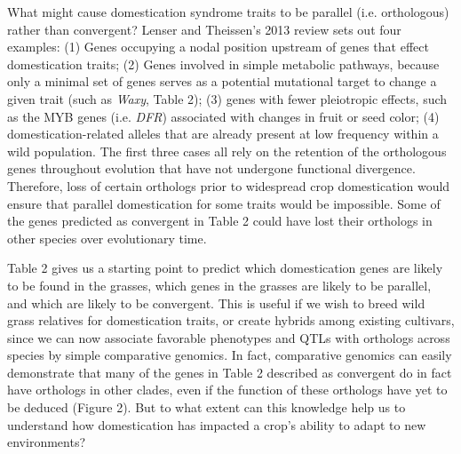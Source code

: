 \documentclass[12pt]{article}
\begin{document}
What might cause domestication syndrome traits to be parallel (i.e. orthologous) rather than convergent?
Lenser and Theissen's 2013 review \citep{Lenser2013} sets out four examples: (1) Genes occupying a nodal position upstream of genes that effect domestication traits; (2) Genes involved in simple metabolic pathways, because only a minimal set of genes serves as a potential mutational target to change a given trait (such as \textit{Waxy}, Table 2); (3) genes with fewer pleiotropic effects, such as the MYB genes (i.e. \textit{DFR}) associated with changes in fruit or seed color; (4) domestication-related alleles that are already present at low frequency within a wild population. 
The first three cases all rely on the retention of the orthologous genes throughout evolution that have not undergone functional divergence.
Therefore, loss of certain orthologs prior to widespread crop domestication would ensure that parallel domestication for some traits would be impossible.
Some of the genes predicted as convergent in Table 2 could have lost their orthologs in other species over evolutionary time.

Table 2 gives us a starting point to predict which domestication genes are likely to be found in the grasses, which genes in the grasses are likely to be parallel, and which are likely to be convergent. This is useful if we wish to breed wild grass relatives for domestication traits, or create hybrids among existing cultivars, since we can now associate favorable phenotypes and QTLs with orthologs across species by simple comparative genomics. In fact, comparative genomics can easily demonstrate that many of the genes in Table 2 described as convergent do in fact have orthologs in other clades, even if the function of these orthologs have yet to be deduced (Figure 2).  But to what extent can this knowledge help us to understand how domestication has impacted a crop's ability to adapt to new environments?
\paragraph{}
\end{document}
